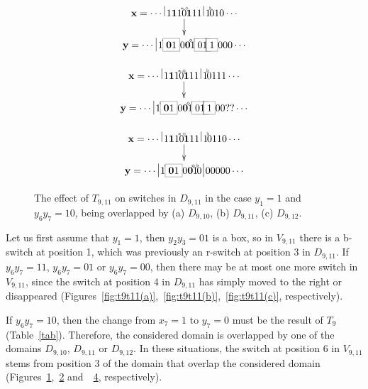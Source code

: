 \documentclass{sn-jnl}
\newcommand{\lllp}{\vline}
\newcommand{\bx}{\mathbf{x}}
\newcommand{\by}{\mathbf{y}}
\newcommand{\gn}[1]{\!^{{}^{{#1}}}\!\!}
\begin{document}
\vspace{-20 pt}
\begin{figure}[h!]
    \centering
    \begin{subfigure}{0.32\textwidth}
{\scriptsize\[
\xymatrix@R=0.5cm{ 
\bx = \cdots \;\lllp  1\boldsymbol{1}1\gn{*}0\gn{\diamond}\boldsymbol{1}11  \,\lllp\, 1\gn{\flat}010\cdots\ar[d]  \\
\by = \cdots \;\lllp1\gn{*}\fcolorbox{gray}{white}{{\bf{0}}1}0\boldsymbol{0}\gn{\diamond}1\gn{\flat}\fcolorbox{gray}{white}{01} \!\!\!\lllp \fcolorbox{gray}{white}{1} 000\cdots 
}
\]}
    \caption{}
    \label{fig:t9t11-cd(a)}
\end{subfigure} 
\hfill
\begin{subfigure}{0.32\textwidth}
{\scriptsize\[
\xymatrix@R=0.5cm{ 
\bx = \cdots \;\lllp  1\boldsymbol{1}1\gn{*}0\gn{\diamond}\boldsymbol{1}11  \,\lllp\, 1\gn{\flat}0111\cdots\ar[d]  \\
\by = \cdots \;\lllp1\gn{*}\fcolorbox{gray}{white}{{\bf{0}}1}0\boldsymbol{0}\gn{\diamond}1\gn{\flat}\fcolorbox{gray}{white}{01} \!\!\!\lllp \fcolorbox{gray}{white}{1} 00{?}{?}\cdots 
}
\]}
\caption{}
\label{fig:t9t11-cd(b)} 
\end{subfigure}
\hfill
\begin{subfigure}{0.32\textwidth}
{\scriptsize\[
\xymatrix@R=0.5cm{ 
\bx = \cdots \;\lllp  1{\boldsymbol{1}}1\gn{*}0\gn{\diamond}{\boldsymbol{1}}11 \,\lllp\,1\gn{\flat}0110\cdots\ar[d]  \\
\by = \cdots \;\lllp1\gn{*}\fcolorbox{gray}{white}{{\bf{0}}1}0{\boldsymbol{0}}\gn{\diamond}1\gn{\flat} 0 \,\lllp\, 00000\cdots 
}
\]}
\caption{}
\label{fig:t9t11-cd(c)} 
\end{subfigure}
\caption{The effect of $T_{9,11}$ on switches in $D_{9,11}$ in the case $y_1=1$ and $y_6y_7=10$, being overlapped by (a)
        $D_{9,10}$, (b) $D_{9,11}$, (c) $D_{9,12}$.}
\end{figure}

Let us first assume that $y_1=1$, then $y_2y_3=01$ is a box, so in $V_{9,11}$ there is a b-switch at position 1, which was previously an r-switch at position 3 in $D_{9,11}$. If $y_6y_7=11$, $y_6y_7=01$ or $y_6y_7=00$, then there may be at most one more switch in $V_{9,11}$, since the switch at position 4 in $D_{9,11}$ has simply moved to the right or disappeared (Figures~\ref{fig:t9t11(a)},~\ref{fig:t9t11(b)},~\ref{fig:t9t11(c)}, respectively).

If $y_6y_7=10$, then the change from $x_7=1$ to $y_7=0$ must be the result of $T_{9}$ (Table~\ref{tab}). Therefore, the considered domain is overlapped by one of the domains $D_{9,10}$, $D_{9,11}$ or $D_{9,12}$. In these situations, the switch at position 6 in $V_{9,11}$ stems from position 3 of the domain that overlap the considered domain (Figures~\ref{fig:t9t11-cd(a)},~\ref{fig:t9t11-cd(b)} and~~\ref{fig:t9t11-cd(c)}, respectively).
\end{document}
